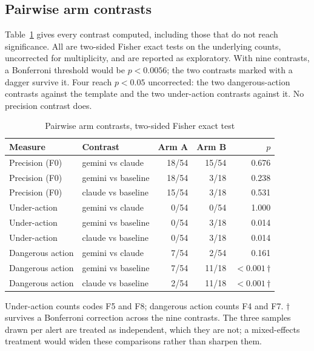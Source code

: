 \subsection{Pairwise arm contrasts}
\label{app:supp:contrasts}

Table~\ref{tab:supp_contrasts} gives every contrast computed, including those that do
not reach significance. All are two-sided Fisher exact tests on the underlying counts,
uncorrected for multiplicity, and are reported as exploratory. With nine contrasts, a
Bonferroni threshold would be $p < \num{0.0056}$; the two contrasts marked with a
dagger survive it. Four reach $p < \num{0.05}$ uncorrected: the two dangerous-action
contrasts against the template and the two under-action contrasts against it. No
precision contrast does.

\begin{table}[H]
\centering
\caption{Pairwise arm contrasts, two-sided Fisher exact test}
\label{tab:supp_contrasts}
\small
\begin{tabular}{@{}llrrr@{}}
\toprule
\textbf{Measure} & \textbf{Contrast} & \textbf{Arm A} & \textbf{Arm B} & \textbf{$p$} \\
\midrule
Precision (F0)   & gemini vs claude   & 18/54 & 15/54 & 0.676 \\
Precision (F0)   & gemini vs baseline & 18/54 & 3/18  & 0.238 \\
Precision (F0)   & claude vs baseline & 15/54 & 3/18  & 0.531 \\
\addlinespace
Under-action     & gemini vs claude   & 0/54  & 0/54  & 1.000 \\
Under-action     & gemini vs baseline & 0/54  & 3/18  & 0.014 \\
Under-action     & claude vs baseline & 0/54  & 3/18  & 0.014 \\
\addlinespace
Dangerous action & gemini vs claude   & 7/54  & 2/54  & 0.161 \\
Dangerous action & gemini vs baseline & 7/54  & 11/18 & $<0.001$\,$\dagger$ \\
Dangerous action & claude vs baseline & 2/54  & 11/18 & $<0.001$\,$\dagger$ \\
\bottomrule
\end{tabular}
\par\vspace{2pt}\footnotesize\raggedright Under-action counts codes F5 and F8;
dangerous action counts F4 and F7. $\dagger$ survives a Bonferroni correction across the
nine contrasts. The three samples drawn per alert are treated as independent, which they
are not; a mixed-effects treatment would widen these comparisons rather than sharpen
them.
\end{table}


